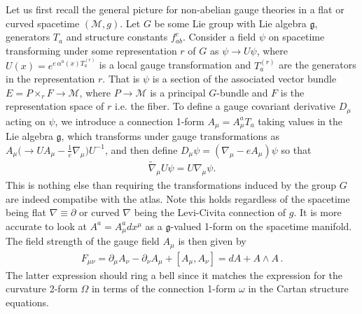 Let us first recall the general picture for non-abelian gauge theories in a flat or curved spacetime $(\mathcal{M},g)$.
Let $G$ be some Lie group with Lie algebra $\mathfrak{g}$, generators $T_a$ and structure constants $f_{ab}^c$.
Consider a field $\psi$ on spacetime transforming under some representation $r$ of $G$ as $\psi \to U \psi$, where $U(x) = e^{e\,\alpha^a(x) T_a^{(r)}}$ is a local gauge transformation and $T_a^{(r)}$ are the generators in the representation $r$.
That is $\psi$ is a section of the associated vector bundle $E = P \times_r F \to \mathcal{M}$, where $P\to \mathcal{M}$ is a principal $G$-bundle and $F$ is the representation space of $r$ i.e. the fiber.
To define a gauge covariant derivative $D_\mu$ acting on $\psi$, we introduce a connection 1-form $A_\mu = A_\mu^a T_a$ taking values in the Lie algebra $\mathfrak{g}$, which transforms under gauge transformations as $A_\mu \big(\to U A_\mu -\tfrac{1}{e} \nabla_\mu \big)U^{-1}$, and then define $D_\mu \psi = (\nabla_\mu - e A_\mu)\psi$ so that
\begin{align}
    \tilde{\nabla}_\mu U\psi = U \nabla_\mu \psi.
\end{align}
This is nothing else than requiring the transformations induced by the group $G$ are indeed compatibe with the atlas.
Note this holds regardless of the spacetime being flat $\nabla\equiv \partial$ or curved $\nabla$ being the Levi-Civita connection of $g$.
It is more accurate to look at $A^a=A^a_\mu dx^\mu$ as a $\mathfrak{g}$-valued 1-form on the spacetime manifold.
The field strength of the gauge field $A_\mu$ is then given by
\begin{align}
    F_{\mu\nu} = \partial_\mu A_\nu - \partial_\nu A_\mu + [A_\mu, A_\nu] = dA +  A \wedge A\,.
\end{align}
The latter expression should ring a bell since it matches the expression for the curvature 2-form $\Omega$ in terms of the connection 1-form $\omega$ in the Cartan structure equations.

